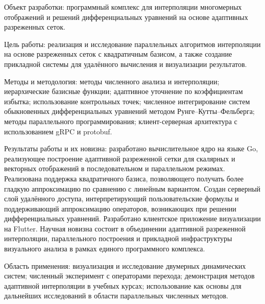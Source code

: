 Объект разработки: программный комплекс для интерполяции многомерных отображений и решений дифференциальных уравнений на основе адаптивных разреженных сеток.

Цель работы: реализация и исследование параллельных алгоритмов интерполяции на основе разреженных сеток с квадратичным базисом, а также создание прикладной системы для удалённого вычисления и визуализации результатов.

Методы и методология: методы численного анализа и интерполяции; иерархические базисные функции; адаптивное уточнение по коэффициентам избытка; использование контрольных точек; численное интегрирование систем обыкновенных дифференциальных уравнений методом Рунге--Кутты--Фельберга; методы параллельного программирования; клиент-серверная архитектура с использованием gRPC и protobuf.

Результаты работы и их новизна: разработано вычислительное ядро на языке Go, реализующее построение адаптивной разреженной сетки для скалярных и векторных отображений в последовательном и параллельном режимах. Реализована поддержка квадратичного базиса, позволяющего получать более гладкую аппроксимацию по сравнению с линейным вариантом. Создан серверный слой удалённого доступа, интерпретирующий пользовательские формулы и поддерживающий аппроксимацию операторов, возникающих при решении дифференциальных уравнений. Разработано клиентское приложение визуализации на Flutter. Научная новизна состоит в объединении адаптивной разреженной интерполяции, параллельного построения и прикладной инфраструктуры визуального анализа в рамках единого программного комплекса.

Область применения: визуализация и исследование двумерных динамических систем; численный эксперимент с операторами перехода; демонстрация методов адаптивной интерполяции в учебных курсах; использование как основы для дальнейших исследований в области параллельных численных методов.